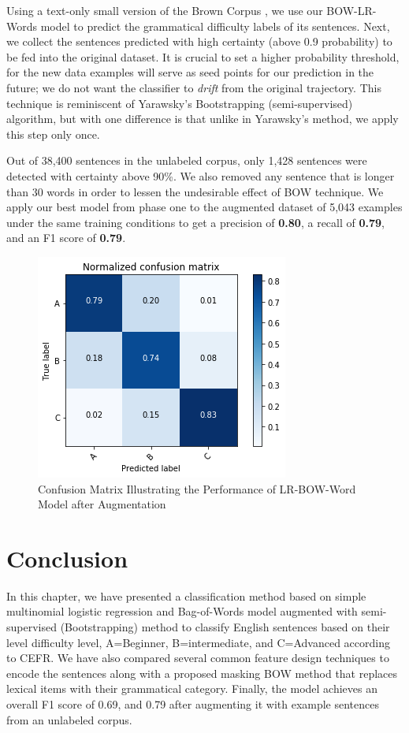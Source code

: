 Using a text-only small version of the Brown Corpus \citep{francis1965standard}, we use our BOW-LR-Words model to predict the grammatical difficulty labels of its sentences. Next, we collect the sentences predicted with high certainty (above 0.9 probability) to be fed into the original dataset. It is crucial to set a higher probability threshold, for the new data examples will serve as seed points for our prediction in the future; we do not want the classifier to \textit{drift} from the original trajectory. \citep{curran2007minimising} This technique is reminiscent of Yarawsky's Bootstrapping \citep{yarowsky_unsupervised_1995}(semi-supervised) algorithm, but with one difference is that unlike in Yarawsky's method, we apply this step only once. 

Out of 38,400 sentences in the unlabeled corpus, only 1,428 sentences were detected with certainty above 90\%. We also removed any sentence that is longer than 30 words in order to lessen the undesirable effect of BOW technique. We apply our best model from phase one to the augmented dataset of 5,043 examples under the same training conditions to get a precision of \textbf{0.80}, a recall of \textbf{0.79}, and an F1 score of \textbf{0.79}. 

\begin{figure}[t]
    \centering
    \includegraphics[width=.75\linewidth]{../Figures/conf_matrix_iter2.png} 
    \caption{Confusion Matrix Illustrating the Performance of LR-BOW-Word Model after Augmentation}
    \label{fig:cmdstudy}
\end{figure}

\section {Conclusion}
\label{sec:conclusion}
In this chapter, we have presented a classification method based on simple multinomial logistic regression and Bag-of-Words model augmented with semi-supervised (Bootstrapping) method to classify English sentences based on their level difficulty level, A=Beginner, B=intermediate, and C=Advanced according to CEFR. We have also compared several common feature design techniques to encode the sentences along with a proposed masking BOW method that replaces lexical items with their grammatical category. Finally, the model achieves an overall F1 score of 0.69, and 0.79 after augmenting it with example sentences from an unlabeled corpus.
